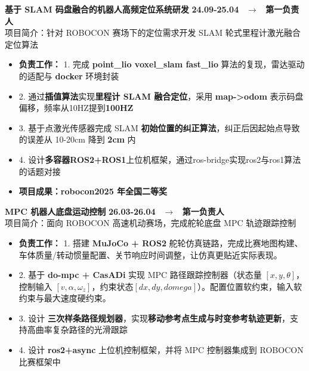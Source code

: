 \documentclass[11pt, a4paper]{article}
\begin{document}
\textbf{基于 SLAM 码盘融合的机器人高频定位系统研发} \hfill \textbf{24.09-25.04} \ $\rightarrow$ \ \textbf{第一负责人} \\
{\kaishu 项目简介：针对 ROBOCON 赛场下的定位需求开发 SLAM 轮式里程计激光融合定位算法}
\begin{itemize}[leftmargin=1.5em, noitemsep, topsep=1pt]
    \item \textbf{负责工作：} 1. 完成 \textbf{point\_lio voxel\_slam fast\_lio} 算法的复现，雷达驱动的适配与 \textbf{docker} 环境封装
    \item 2. 通过\textbf{插值算法}实现\textbf{里程计 SLAM 融合定位}，采用 \textbf{map->odom} 表示码盘偏移，频率从10HZ提到\textbf{100HZ}
    \item 3. 基于点激光传感器完成 SLAM \textbf{初始位置的纠正算法}，纠正后因起始点导致的误差从 10-20cm 降到 \textbf{2cm} 内
    \item 4. 设计\textbf{多容器ROS2+ROS1}上位机框架，通过ros-bridge实现ros2与ros1算法的话题对接
    \item \textbf{项目成果：robocon2025 年全国二等奖}
\end{itemize}

\vspace{3pt}
\textbf{MPC 机器人底盘运动控制} \hfill \textbf{26.03-26.04} \ $\rightarrow$ \ \textbf{第一负责人} \\
{\kaishu 项目简介：面向 ROBOCON 高速机动赛场，完成舵轮底盘 MPC 轨迹跟踪控制}
\begin{itemize}[leftmargin=1.5em, noitemsep, topsep=1pt]
    \item \textbf{负责工作：} 1. 搭建 \textbf{MuJoCo + ROS2} 舵轮仿真链路，完成比赛地图构建、车体质量/转动惯量配置、关节响应时间调整，让仿真更贴近实际表现。
    \item 2. 基于 \textbf{do-mpc + CasADi} 实现 MPC 路径跟踪控制器（状态量 $[x,y,\theta]$，控制输入 $[v,\alpha,\omega_z]$，约束状态$[dx,dy,domega]$）。配置位置软约束，输入软约束与最大速度硬约束。
    \item 3. 设计 \textbf{三次样条路径规划器}，实现\textbf{移动参考点生成与时变参考轨迹更新}，支持高曲率复杂路径的光滑跟踪
    \item 4. 设计 \textbf{ros2+async} 上位机控制框架，并将 MPC 控制器集成到 ROBOCON 比赛框架中
\end{itemize}
\end{document}
